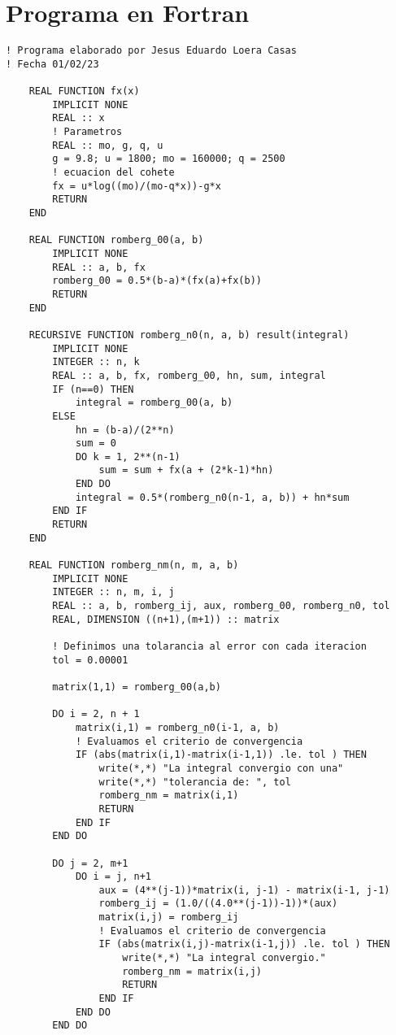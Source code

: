 \section{Programa en Fortran}


\begin{lstlisting}
! Programa elaborado por Jesus Eduardo Loera Casas
! Fecha 01/02/23

    REAL FUNCTION fx(x)
        IMPLICIT NONE
        REAL :: x
        ! Parametros
        REAL :: mo, g, q, u
        g = 9.8; u = 1800; mo = 160000; q = 2500
        ! ecuacion del cohete
        fx = u*log((mo)/(mo-q*x))-g*x
        RETURN 
    END

    REAL FUNCTION romberg_00(a, b)   
        IMPLICIT NONE
        REAL :: a, b, fx
        romberg_00 = 0.5*(b-a)*(fx(a)+fx(b))
        RETURN
    END

    RECURSIVE FUNCTION romberg_n0(n, a, b) result(integral)
        IMPLICIT NONE
        INTEGER :: n, k
        REAL :: a, b, fx, romberg_00, hn, sum, integral
        IF (n==0) THEN
            integral = romberg_00(a, b)
        ELSE 
            hn = (b-a)/(2**n)
            sum = 0
            DO k = 1, 2**(n-1)
                sum = sum + fx(a + (2*k-1)*hn)
            END DO
            integral = 0.5*(romberg_n0(n-1, a, b)) + hn*sum
        END IF
        RETURN
    END

    REAL FUNCTION romberg_nm(n, m, a, b)
        IMPLICIT NONE
        INTEGER :: n, m, i, j
        REAL :: a, b, romberg_ij, aux, romberg_00, romberg_n0, tol
        REAL, DIMENSION ((n+1),(m+1)) :: matrix

        ! Definimos una tolarancia al error con cada iteracion
        tol = 0.00001
            
        matrix(1,1) = romberg_00(a,b)

        DO i = 2, n + 1
            matrix(i,1) = romberg_n0(i-1, a, b)
            ! Evaluamos el criterio de convergencia
            IF (abs(matrix(i,1)-matrix(i-1,1)) .le. tol ) THEN
                write(*,*) "La integral convergio con una" 
                write(*,*) "tolerancia de: ", tol
                romberg_nm = matrix(i,1)
                RETURN
            END IF
        END DO

        DO j = 2, m+1
            DO i = j, n+1
                aux = (4**(j-1))*matrix(i, j-1) - matrix(i-1, j-1)
                romberg_ij = (1.0/((4.0**(j-1))-1))*(aux)
                matrix(i,j) = romberg_ij
                ! Evaluamos el criterio de convergencia
                IF (abs(matrix(i,j)-matrix(i-1,j)) .le. tol ) THEN
                    write(*,*) "La integral convergio."
                    romberg_nm = matrix(i,j)
                    RETURN
                END IF
            END DO
        END DO


\end{lstlisting}
